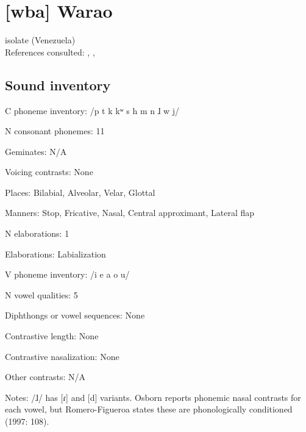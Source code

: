 {\section*{[wba] Warao} %
isolate (Venezuela)\medskip\\
References consulted: \citet{Arinterol2000}, \citet{Osborn1966}, \citet{Romero-Figeroa1997}

\subsection*{Sound inventory}
\begin{appendixdesc}

\item[C phoneme inventory:] /p t k kʷ s h m n ɺ w j/

\item[N consonant phonemes:] 11

\item[Geminates:] N/A

\item[Voicing contrasts:] None

\item[Places:] Bilabial, Alveolar, Velar, Glottal

\item[Manners:] Stop, Fricative, Nasal, Central approximant, Lateral flap

\item[N elaborations:] 1

\item[Elaborations:] Labialization

\item[V phoneme inventory:] /i e a o u/

\item[N vowel qualities:] 5

\item[Diphthongs or vowel sequences:] None

\item[Contrastive length:] None

\item[Contrastive nasalization:] None

\item[Other contrasts:] N/A

\item[Notes:] /ɺ/ has [ɾ] and [d] variants. Osborn reports phonemic nasal contrasts for each vowel, but Romero-Figueroa states these are phonologically conditioned (1997: 108).
\end{appendixdesc}
}
